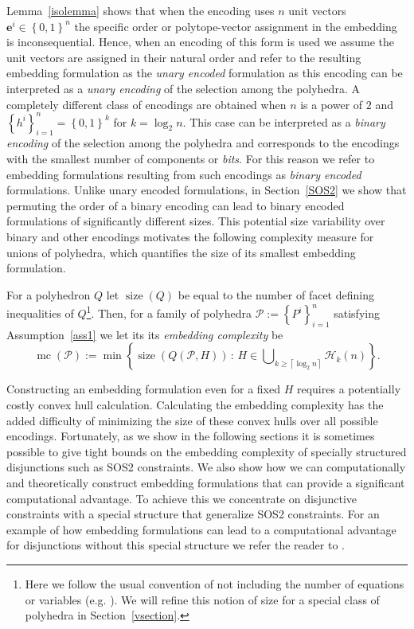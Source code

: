 \documentclass[mnsc]{informs3}
\newcommand{\set}[1]{\left\{#1\right\}}                     %
\newcommand{\bra}[1]{\left(#1\right)}
\newcommand{\e}{\mathbf{e}}
\DeclareMathOperator{\size}{size}
\DeclareMathOperator{\mmc}{mc}
\begin{document}
Lemma~\ref{isolemma} shows that when the encoding uses $n$ unit vectors $\e^i\in \set{0,1}^n$ the specific order or polytope-vector assignment in the embedding is inconsequential. Hence, when an encoding of this form is used we assume the unit vectors are assigned in their natural order and refer to the resulting embedding formulation as the \emph{unary encoded} formulation as this encoding can be interpreted as a \emph{unary encoding} of the selection among the polyhedra. A completely different class of encodings are obtained when  $n$ is a power of $2$ and  $\set{h^i}_{i=1}^n=\set{0,1}^k$ for $k=\log_2 n$. This case can be interpreted as a \emph{binary encoding} of the selection among the polyhedra and corresponds to the encodings with the smallest number of components or \emph{bits}. For this reason we refer to embedding formulations resulting from such encodings as \emph{binary encoded} formulations. Unlike unary encoded formulations, in Section~\ref{SOS2} we show that permuting the order of a binary encoding can lead to  binary encoded formulations of significantly different sizes. This potential size variability over binary and other encodings motivates the following complexity measure for unions of polyhedra, which quantifies the size of its smallest embedding formulation. 

\begin{definition} For a polyhedron $Q$ let $\size(Q)$ be equal to the number of facet defining inequalities of $Q$\footnote{Here we follow the usual convention of not including the number of equations or variables (e.g. \cite{Kaibel11}). We will refine this notion of size for a special class of polyhedra in Section~\ref{vsection}.}.  Then, for a family of polyhedra $\mathcal{P}:=\set{P^i}_{i=1}^n$ satisfying Assumption~\ref{ass1} we let its its \emph{embedding complexity} be 
\[\mmc\bra{\mathcal{P}}:=\min\set{\size\bra{Q\bra{\mathcal{P},H}}\,:\,  H\in \bigcup\nolimits_{k\geq \left\lceil \log_2 n\right\rceil}  \mathcal{H}_k(n) }.\]
\end{definition}

Constructing an embedding formulation even for a fixed $H$ requires a potentially costly convex hull calculation. Calculating the embedding complexity has the added difficulty of minimizing the size of these convex hulls over all possible encodings. Fortunately, as we show in the following sections it is sometimes possible to give tight bounds on the embedding complexity of specially structured disjunctions such as SOS2 constraints. We also show how we can computationally and theoretically construct embedding formulations that can provide a significant computational advantage. To achieve this we concentrate on disjunctive constraints with a special structure that generalize SOS2 constraints. For an example of how embedding formulations can lead to a computational advantage for disjunctions without this special structure we refer the reader to \cite{huchette2016strong}.
\end{document}
